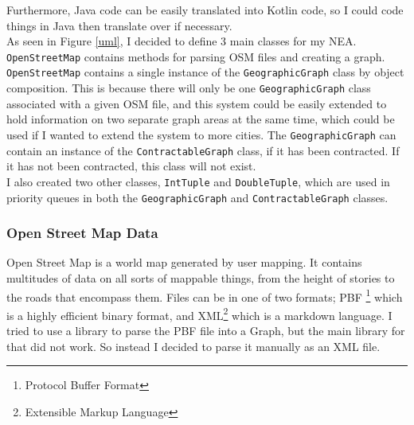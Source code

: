 \documentclass[11pt,twoside,a4paper]{article}
\begin{document}
Furthermore, Java code can be easily translated into Kotlin code, so I could code things in Java then translate over if necessary.\\
As seen in Figure \ref{uml}, I decided to define 3 main classes for my NEA. \texttt{OpenStreetMap} contains methods for parsing OSM files and creating a graph.
\texttt{OpenStreetMap} contains a single instance of the \texttt{GeographicGraph} class by object composition. This is because there will only be one \texttt{GeographicGraph}
class associated with a given OSM file, and this system could be easily extended to hold information on two separate graph areas at the same time, which could be used if I wanted
to extend the system to more cities. The \texttt{GeographicGraph} can contain an instance of the \texttt{ContractableGraph} class, if it has been contracted. If it has not been contracted,
this class will not exist.\\
I also created two other classes, \texttt{IntTuple} and \texttt{DoubleTuple}, which are used in priority queues in both the \texttt{GeographicGraph} and \texttt{ContractableGraph} classes.\\
\subsubsection{Open Street Map Data}
Open Street Map is a world map generated by user mapping. It contains multitudes of data on all sorts of mappable things, from the height of stories to the roads that encompass them.
Files can be in one of two formats; PBF \footnote{Protocol Buffer Format} which is a highly efficient binary format, and XML\footnote{Extensible Markup Language} which is a markdown language. I tried to use a library to parse 
the PBF file into a Graph, but the main library for that did not work. So instead I decided to parse it manually as an XML file.\\
\end{document}
